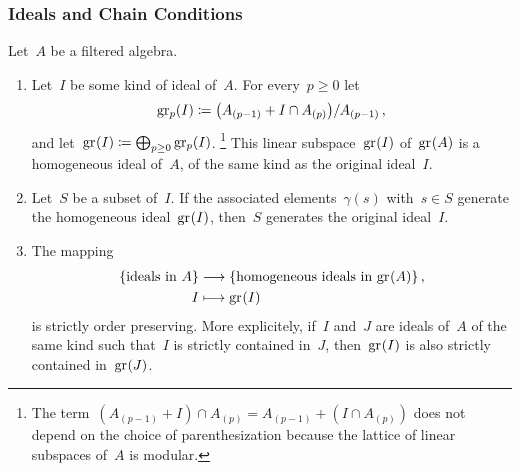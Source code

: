 \subsubsection{Ideals and Chain Conditions}

\begin{proposition}
	\label{associated graded ideals}
	Let~$A$ be a filtered algebra.
	\begin{enumerate}
		\item
			Let~$I$ be some kind of ideal of~$A$.
			For every~$p \geq 0$ let
			\[
				\gr[p](I)
				\defined
				\bigl( A_{(p-1)} + I \cap A_{(p)} \bigr) / A_{(p-1)} \,,
			\]
			and let~$\gr(I) \defined \bigoplus_{p \geq 0} \gr[p](I)$.%
			\footnote{
				The term~$(A_{(p-1)} + I) \cap A_{(p)} = A_{(p-1)} + (I \cap A_{(p)})$ does not depend on the choice of parenthesization because the lattice of linear subspaces of~$A$ is modular.
			}
			This linear subspace~$\gr(I)$ of~$\gr(A)$ is a homogeneous ideal of~$A$, of the same kind as the original ideal~$I$.
		\item
			\label{pulling back generating set from graded ideal}
			Let~$S$ be a subset of~$I$.
			If the associated elements~$\gamma(s)$ with~$s \in S$ generate the homogeneous ideal~$\gr(I)$, then~$S$ generates the original ideal~$I$.
		\item
			The mapping
			\begin{align*}
				\{ \text{ideals in~$A$} \}
				&\to
				\{ \text{homogeneous ideals in~$\gr(A)$} \}  \,,
				\\
				I
				&\mapsto
				\gr(I)
			\end{align*}
			is strictly order preserving.
			More explicitely, if~$I$ and~$J$ are ideals of~$A$ of the same kind such that~$I$ is strictly contained in~$J$, then~$\gr(I)$ is also strictly contained in~$\gr(J)$.
	\end{enumerate}
\end{proposition}



